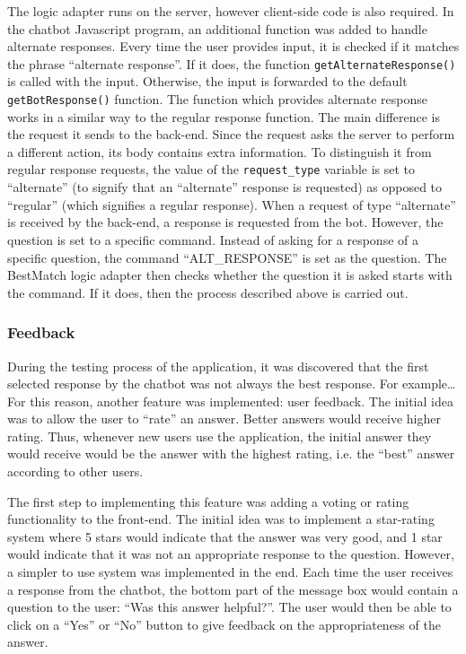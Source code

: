 \documentclass[12pt,a4paper]{article}
\begin{document}
The logic adapter runs on the server, however client-side code is also required. In the chatbot Javascript program, an additional function was added to handle alternate responses. Every time the user provides input, it is checked if it matches the phrase “alternate response”. If it does, the function \texttt{getAlternateResponse()} is called with the input. Otherwise, the input is forwarded to the default \texttt{getBotResponse()} function. The function which provides alternate response works in a similar way to the regular response function. The main difference is the request it sends to the back-end. Since the request asks the server to perform a different action, its body contains extra information. To distinguish it from regular response requests, the value of the \texttt{request\_type} variable is set to “alternate” (to signify that an “alternate” response is requested) as opposed to “regular” (which signifies a regular response). When a request of type “alternate” is received by the back-end, a response is requested from the bot. However, the question is set to a specific command. Instead of asking for a response of a specific question, the command “ALT\_RESPONSE” is set as the question.  The BestMatch logic adapter then checks whether the question it is asked starts with the command. If it does, then the process described above is carried out.

\subsubsection{Feedback}
During the testing process of the application, it was discovered that the first selected response by the chatbot was not always the best response. For example… For this reason, another feature was implemented: user feedback. The initial idea was to allow the user to “rate” an answer. Better answers would receive higher rating. Thus, whenever new users use the application, the initial answer they would receive would be the answer with the highest rating, i.e. the “best” answer according to other users.

The first step to implementing this feature was adding a voting or rating functionality to the front-end. The initial idea was to implement a star-rating system where 5 stars would indicate that the answer was very good, and 1 star would indicate that it was not an appropriate response to the question. However, a simpler to use system was implemented in the end. Each time the user receives a response from the chatbot, the bottom part of the message box would contain a question to the user: “Was this answer helpful?”. The user would then be able to click on a “Yes” or “No” button to give feedback on the appropriateness of the answer. 
\end{document}
